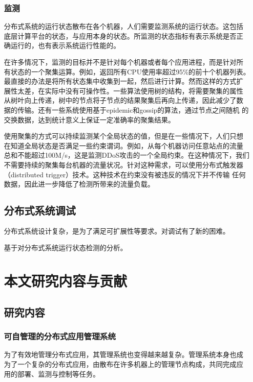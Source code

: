 \subsubsection*{监测}

分布式系统的运行状态散布在各个机器，人们需要监测系统的运行状态。这包括
底层计算平台的状态，与应用本身的状态。所监测的状态指标有表示系统是否正
确运行的，也有表示系统运行性能的。

在许多情况下，监测的目标并不是针对每个机器或者每个应用进程，而是针对所
有状态的一个聚集运算。例如，返回所有CPU使用率超过95\%的前十个机器列表。
最直接的办法是将所有状态集中收集到一起，然后进行计算。然而这样的方式扩
展性太差，在实际中没有可操作性。一些算法使用树的结构，将需要聚集的属性
从树叶向上传递，树中的节点将子节点的结果聚集后再向上传递，因此减少了数
据的传输。还有一些系统使用基于epidemic和gossip的算法，通过节点之间随机
的交换数据，达到统计意义上保证一定准确率的聚集结果。

使用聚集的方式可以持续监测某个全局状态的值，但是在一些情况下，人们只想
在知道全局状态是否满足一些约束谓词。例如，从每个机器访问任意站点的流量
总和不能超过100M/s，这是监测DDoS攻击的一个全局约束。在这种情况下，我们
不需要持续的聚集每台机器的流量状况。针对这种需求，可以使用分布式触发器
（distributed trigger）技术。这种技术在约束没有被违反的情况下并不传输
任何数据，因此进一步降低了检测所带来的流量负载。

\subsection{分布式系统调试}

分布式系统设计复杂，是为了满足可扩展性等要求。对调试有了新的困难。

基于对分布式系统运行状态检测的分析。


\section{本文研究内容与贡献}

\subsection{研究内容}

\subsubsection*{可自管理的分布式应用管理系统}

为了有效地管理分布式应用，其管理系统也变得越来越复杂。管理系统本身也成
为了一个复杂的分布式应用，由散布在许多机器上的管理节点构成，共同完成应
用的部署、监测与控制等任务。

